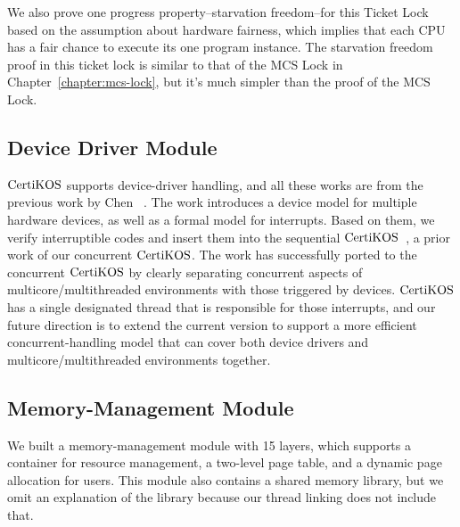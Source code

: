 We also prove one progress property--starvation freedom--for this Ticket Lock based on the assumption about hardware fairness,
which implies that each CPU has a fair chance to execute its one program instance.
The starvation freedom proof in this ticket lock is 
similar to that of the MCS Lock in Chapter~\ref{chapter:mcs-lock}, but 
it's much simpler than the proof of the MCS Lock.

\subsection{Device Driver Module}
\label{chapter:certikos:subsec:device-driver-module}

$\mathrm{CertiKOS}$ supports device-driver handling, and all these works are from the previous work by  Chen \etal~\cite{certikos:interrupt}.
The work introduces a device model for multiple hardware devices,
as well as a formal model for interrupts. 
Based on them, we verify interruptible codes and insert them into the sequential $\mathrm{CertiKOS}$~\cite{deepspec}, a prior work of our concurrent $\mathrm{CertiKOS}$. 
The work has  successfully ported to the concurrent $\mathrm{CertiKOS}$
by clearly separating  concurrent aspects of multicore/multithreaded environments
with those triggered by devices.
$\mathrm{CertiKOS}$ has a single designated thread that is responsible for those interrupts,
and our future direction is to extend the current version to support a more efficient concurrent-handling model that can cover both device drivers and multicore/multithreaded environments together.

\subsection{Memory-Management Module}
\label{chapter:certikos:subsec:memory-management-module}

We built a memory-management module with 15 layers, 
which supports a container for resource management, a two-level page table, and a dynamic page allocation for users.
This module also contains a shared memory library,
but we omit an explanation of the library because our thread linking does not include that. 

